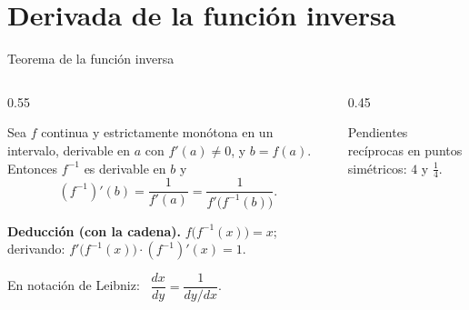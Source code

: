 \documentclass[10pt,aspectratio=169]{beamer}
\begin{document}
\section{Derivada de la función inversa}

\begin{frame}{Teorema de la función inversa}
  \begin{columns}
    \begin{column}{0.55\textwidth}
      \begin{teorema}
        Sea $f$ continua y estrictamente monótona en un intervalo, derivable en $a$ con $f'(a)\neq0$, y $b=f(a)$.
        Entonces $f^{-1}$ es derivable en $b$ y
        \[ \left(f^{-1}\right)'(b)=\frac{1}{f'(a)}=\frac{1}{f'\big(f^{-1}(b)\big)}. \]
      \end{teorema}
      \textbf{Deducción (con la cadena).} $f\big(f^{-1}(x)\big)=x$; derivando: $f'\big(f^{-1}(x)\big)\cdot(f^{-1})'(x)=1$.
      \smallskip

      En notación de Leibniz: \ $\dfrac{dx}{dy}=\dfrac{1}{dy/dx}$.
    \end{column}
    \begin{column}{0.45\textwidth}
      \centering

      \small Pendientes recíprocas en puntos simétricos: $4$ y $\frac14$.
    \end{column}
  \end{columns}
\end{frame}
\end{document}
